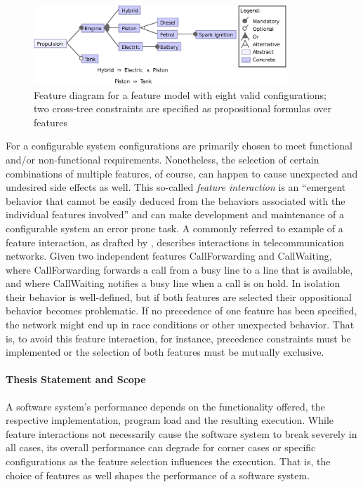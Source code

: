 \begin{figure}[htbp]
  \centering
  	
  	\includegraphics[width=0.85\textwidth]{images/introduction_fm.eps}
  \caption{Feature diagram for a feature model with eight valid configurations;
  two cross-tree constraints are specified as propositional formulas over
  features}
  \label{fig:introduction_fm}
\end{figure}

For a configurable system configurations are primarily chosen to meet
functional and/or non-functional requirements. Nonetheless, the selection of
certain combinations of multiple features, of course, can happen to cause
unexpected and undesired side effects as well. This so-called \emph{feature
interaction} is an ``emergent behavior that cannot be easily deduced from the
behaviors associated with the individual features involved''
\citep{apel_feature-oriented_2013} and can make development and
maintenance of a configurable system an error prone task. 
A commonly referred to example of a feature interaction, as drafted by
\cite{calder_feature_2003}, describes interactions in telecommunication networks. Given two
independent features \textsf{CallForwarding} and \textsf{CallWaiting}, where \textsf{CallForwarding} forwards a call from a busy line to a line that is
available, and where \textsf{CallWaiting} notifies a busy line when a call is on
hold. In isolation their behavior is well-defined, but if both features are selected their oppositional
behavior becomes problematic. If no precedence of one feature has been
specified, the network might end up in race conditions or other unexpected
behavior. That is, to avoid this feature interaction, for instance, precedence
constraints must be implemented or the selection of both features must be
mutually exclusive.


\paragraph*{Thesis Statement and Scope}
A software system’s performance depends on the functionality offered, the
respective implementation, program load and the resulting execution. While
feature interactions not necessarily cause the software system to break
severely in all cases, its overall performance can degrade for corner cases or
specific configurations as the feature selection influences the execution. That
is, the choice of features as well shapes the performance of a software system.


